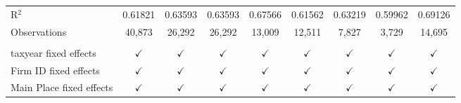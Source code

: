 \begin{tabular}{lcccccccc}
    \\
   R$^2$                                   & 0.61821       & 0.63593        & 0.63593        & 0.67566        & 0.61562        & 0.63219       & 0.59962       & 0.69126\\  
   Observations                            & 40,873        & 26,292         & 26,292         & 13,009         & 12,511         & 7,827         & 3,729         & 14,695\\  
    \\
   taxyear fixed effects                   & $\checkmark$  & $\checkmark$   & $\checkmark$   & $\checkmark$   & $\checkmark$   & $\checkmark$  & $\checkmark$  & $\checkmark$\\   
   Firm ID fixed effects                   & $\checkmark$  & $\checkmark$   & $\checkmark$   & $\checkmark$   & $\checkmark$   & $\checkmark$  & $\checkmark$  & $\checkmark$\\   
   Main Place fixed effects                & $\checkmark$  & $\checkmark$   & $\checkmark$   & $\checkmark$   & $\checkmark$   & $\checkmark$  & $\checkmark$  & $\checkmark$\\   
   \bottomrule
\end{tabular}
\par\endgroup

